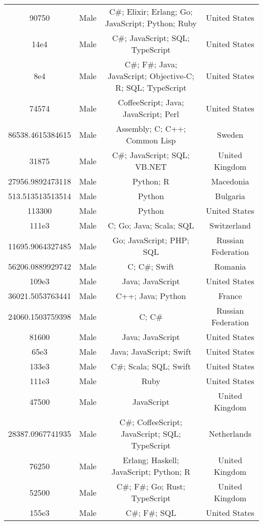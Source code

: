 \begin{center}
\begin{tabular}{ |c|c|c|c| }
90750  &  Male  &  C\#; Elixir; Erlang; Go; JavaScript; Python; Ruby  &  United States  \\ 
14e4  &  Male  &  C\#; JavaScript; SQL; TypeScript  &  United States  \\ 
8e4  &  Male  &  C\#; F\#; Java; JavaScript; Objective-C; R; SQL; TypeScript  &  United States  \\ 
74574  &  Male  &  CoffeeScript; Java; JavaScript; Perl  &  United States  \\ 
86538.4615384615  &  Male  &  Assembly; C; C++; Common Lisp  &  Sweden  \\ 
31875  &  Male  &  C\#; JavaScript; SQL; VB.NET  &  United Kingdom  \\ 
27956.9892473118  &  Male  &  Python; R  &  Macedonia  \\ 
513.513513513514  &  Male  &  Python  &  Bulgaria  \\ 
113300  &  Male  &  Python  &  United States  \\ 
111e3  &  Male  &  C; Go; Java; Scala; SQL  &  Switzerland  \\ 
11695.9064327485  &  Male  &  Go; JavaScript; PHP; SQL  &  Russian Federation  \\ 
56206.0889929742  &  Male  &  C; C\#; Swift  &  Romania  \\ 
109e3  &  Male  &  Java; JavaScript  &  United States  \\ 
36021.5053763441  &  Male  &  C++; Java; Python  &  France  \\ 
24060.1503759398  &  Male  &  C; C\#  &  Russian Federation  \\ 
81600  &  Male  &  Java; JavaScript  &  United States  \\ 
65e3  &  Male  &  Java; JavaScript; Swift  &  United States  \\ 
133e3  &  Male  &  C\#; Scala; SQL; Swift  &  United States  \\ 
111e3  &  Male  &  Ruby  &  United States  \\ 
47500  &  Male  &  JavaScript  &  United Kingdom  \\ 
28387.0967741935  &  Male  &  C\#; CoffeeScript; JavaScript; SQL; TypeScript  &  Netherlands  \\ 
76250  &  Male  &  Erlang; Haskell; JavaScript; Python; R  &  United Kingdom  \\ 
52500  &  Male  &  C\#; F\#; Go; Rust; TypeScript  &  United Kingdom  \\ 
155e3  &  Male  &  C\#; F\#; SQL  &  United States  \\ 

\end{tabular}
\end{center}
